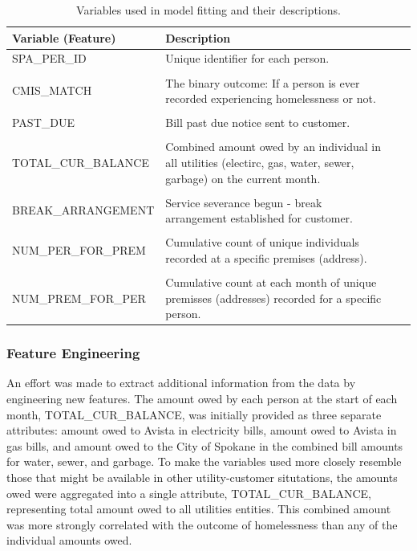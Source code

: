 \documentclass[10pt,letterpaper]{article}
\begin{document}
\begin{table}[htb]
    \centering
    \begin{tabular}{l p{8cm} l p{14cm}}
        \toprule
        Variable (Feature) &                  Description \\
        \toprule \vspace{0.25cm}
        SPA\_PER\_ID & Unique identifier for each person. \\
        \hline \\
        CMIS\_MATCH & The binary outcome: If a person is ever recorded experiencing homelessness or not. \\
        \hline \\
        PAST\_DUE & Bill past due notice sent to customer. \\
        \hline \\
        TOTAL\_CUR\_BALANCE & Combined amount owed by an individual in all utilities (electirc, gas, water, sewer, garbage) on the current month. \\
        \hline \\
        BREAK\_ARRANGEMENT & Service severance begun - break arrangement established for customer. \\
        \hline \\
        NUM\_PER\_FOR\_PREM & Cumulative count of unique individuals recorded at a specific premises (address). \\
        \hline \\
        NUM\_PREM\_FOR\_PER & Cumulative count at each month of unique premisses (addresses) recorded for a specific person. \\
        \midrule
    \end{tabular}
    \caption[Variables Used]{Variables used in model fitting and their descriptions.}
    \label{tbl:varsUsed}
\end{table}

\subsubsection*{Feature Engineering}
An effort was made to extract additional information from the data by engineering new features. The amount owed by each person at the start of each month, TOTAL\_CUR\_BALANCE, was initially provided as three separate attributes: amount owed to Avista in electricity bills, amount owed to Avista in gas bills, and amount owed to the City of Spokane in the combined bill amounts for water, sewer, and garbage. To make the variables used more closely resemble those that might be available in other utility-customer situtations, the amounts owed were aggregated into a single attribute, TOTAL\_CUR\_BALANCE, representing total amount owed to all utilities entities. This combined amount was more strongly correlated with the outcome of homelessness than any of the individual amounts owed.
\end{document}
